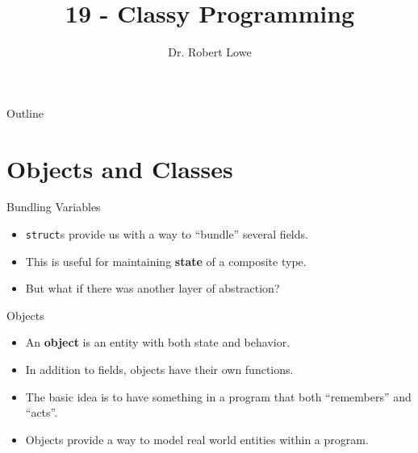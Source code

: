 \documentclass[]{beamer}
\title{19 - Classy Programming}
\author{Dr. Robert Lowe\\}
\institute[Maryville College] %
{
  Division of Mathematics and Computer Science\\
  Maryville College
}
\date[]{}
\begin{document}
\begin{frame}
  \titlepage
\end{frame}

\begin{frame}{Outline}
  \tableofcontents
\end{frame}





\section{Objects and Classes}

\begin{frame}{Bundling Variables}
    \begin{itemize}[<+->]
        \item \texttt{struct}s provide us with a way to ``bundle''
            several fields.
        \item This is useful for maintaining \textbf{state} of a composite
            type.
        \item But what if there was another layer of abstraction?
    \end{itemize}
\end{frame}

\begin{frame}{Objects}
    \begin{itemize}[<+->]
        \item An \textbf{object} is an entity with both state and
            behavior.
        \item In addition to fields, objects have their own functions.
        \item The basic idea is to have something in a program that
            both ``remembers'' and ``acts''.
        \item Objects provide a way to model real world entities
            within a program.
    \end{itemize}
\end{frame}
\end{document}
